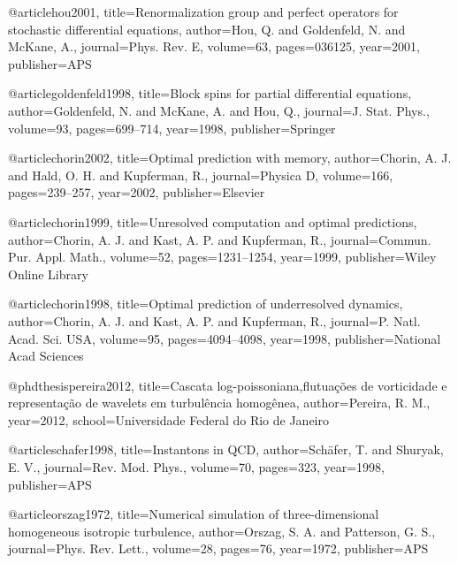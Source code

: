 
  @article{hou2001,
    title={{Renormalization group and perfect operators for stochastic differential equations}},
    author={Hou, Q. and Goldenfeld, N. and McKane, A.},
    journal={Phys. Rev. E},
    volume={63},
    pages={036125},
    year={2001},
    publisher={APS}
  }

  @article{goldenfeld1998,
    title={{Block spins for partial differential equations}},
    author={Goldenfeld, N. and McKane, A. and Hou, Q.},
    journal={J. Stat. Phys.},
    volume={93},
    pages={699--714},
    year={1998},
    publisher={Springer}
  }

  @article{chorin2002,
    title={{Optimal prediction with memory}},
    author={Chorin, A. J. and Hald, O. H. and Kupferman, R.},
    journal={Physica D},
    volume={166},
    pages={239--257},
    year={2002},
    publisher={Elsevier}
  }

  @article{chorin1999,
    title={{Unresolved computation and optimal predictions}},
    author={Chorin, A. J. and Kast, A. P. and Kupferman, R.},
    journal={Commun. Pur. Appl. Math.},
    volume={52},
    pages={1231--1254},
    year={1999},
    publisher={Wiley Online Library}
  }

  @article{chorin1998,
    title={{Optimal prediction of underresolved dynamics}},
    author={Chorin, A. J. and Kast, A. P. and Kupferman, R.},
    journal={P. Natl. Acad. Sci. USA},
    volume={95},
    pages={4094--4098},
    year={1998},
    publisher={National Acad Sciences}
  }


  @phdthesis{pereira2012,
    title={{Cascata log-poissoniana,flutua{\c{c}}{\~o}es de vorticidade e representa{\c{c}}{\~a}o de wavelets em turbul{\^e}ncia homog{\^e}nea}},
    author={Pereira, R. M.},
    year={2012},
    school={Universidade Federal do Rio de Janeiro}
  }


  @article{schafer1998,
    title={{Instantons in QCD}},
    author={Sch{\"a}fer, T. and Shuryak, E. V.},
    journal={Rev. Mod. Phys.},
    volume={70},
    pages={323},
    year={1998},
    publisher={APS}
  }

@article{orszag1972,
  title={{Numerical simulation of three-dimensional homogeneous isotropic turbulence}},
  author={Orszag, S. A. and Patterson, G. S.},
  journal={Phys. Rev. Lett.},
  volume={28},
  pages={76},
  year={1972},
  publisher={APS}
}

